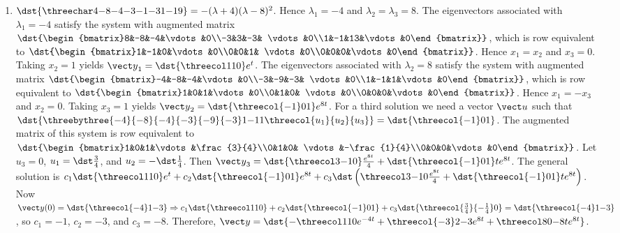 \documentclass[openany]{book}
\newenvironment{sectionSolutions}{
 \begin{enumerate}[item-label={\thesection.\arabic{enumi}.}]
}{
 \end{enumerate}
}
\begin{document}
\begin{sectionSolutions}
\item
$\dst{\threechar4{-8}{-4}{-3}{-1}{-3}1{-1}9}
=-(\lambda+4)(\lambda-8)^2$.
Hence $\lambda_1=-4$ and  $\lambda_2=\lambda_3=8$.
The eigenvectors associated
 with $\lambda_1=-4$ satisfy the system with  augmented matrix
$\dst{\begin{bmatrix}8&-8&-4&\vdots&0\\-3&3&-3&
\vdots&0\\1&-1&13&\vdots&0\end{bmatrix}}$,
which is row equivalent to
$\dst{\begin{bmatrix}1&-1&0&\vdots&0\\0&0&1&
\vdots&0\\0&0&0&\vdots&0\end{bmatrix}}$.
Hence  $x_1=x_2$ and $x_3=0$.  Taking $x_2=1$
yields
${\vect y}_1=\dst{\threecol110}e^{t}$.
The eigenvectors associated
 with $\lambda_2=8$ satisfy the system with  augmented matrix
$\dst{\begin{bmatrix}-4&-8&-4&\vdots&0\\-3&-9&-3&
\vdots&0\\1&-1&1&\vdots&0\end{bmatrix}}$,
which is row equivalent to
$\dst{\begin{bmatrix}1&0&1&\vdots&0\\0&1&0&
\vdots&0\\0&0&0&\vdots&0\end{bmatrix}}$.
Hence  $x_1=-x_3$ and $x_2=0$.  Taking $x_3=1$
yields
${\vect y}_2=\dst{\threecol{-1}01}e^{8t}$.
For a third solution we need a vector ${\vect u}$ such that
$\dst{\threebythree{-4}{-8}{-4}{-3}{-9}{-3}1{-1}1
\threecol{u_1}{u_2}{u_3}}=\dst{\threecol{-1}01}$.
The augmented matrix of this system is row equivalent to
$\dst{\begin{bmatrix}1&0&1&\vdots&\frac{3}{4}\\0&1&0&
\vdots&-\frac{1}{4}\\0&0&0&\vdots&0\end{bmatrix}}$.
Let $u_3=0$, $u_1=\dst\frac{3}{4}$, and $u_2=-\dst\frac{1}{4}$. Then ${\vect
y}_3=\dst{\threecol3{-1}0}\frac{e^{8t}}{4}+\dst{\threecol{-1}01}te^{8t}$.
The general solution is
$c_1\dst{\threecol110}e^{t}+
c_2\dst{\threecol{-1}01}e^{8t}+
c_3\dst\left({\threecol3{-1}0}\frac{e^{8t}}{4}+
\dst{\threecol{-1}01}te^{8t}\right)$.
Now ${\vect y}(0)=\dst{\threecol{-4}1{-3}}\Rightarrow
c_1\dst{\threecol110}+
c_2\dst{\threecol{-1}01}+
c_3\dst{\threecol{\frac{3}{4}}{-\frac{1}{4}}0}=\dst{\threecol{-4}1{-3}}$,
so $c_1=-1$, $c_2=-3$, and $c_3=-8$.  Therefore,
${\vect y}=\dst{-\threecol110e^{-4t}+\threecol{-3}2{-3}e^{8t}+
\threecol80{-8}te^{8t}}$.



\end{sectionSolutions}
\end{document}
